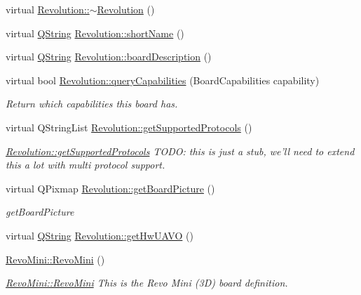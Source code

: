 \begin{DoxyCompactItemize}
virtual \hyperlink{group___boards___open_pilot_plugin_ga231a5a6f79ce02a7e05009982fb65d15}{\-Revolution\-::$\sim$\-Revolution} ()
\item 
virtual \hyperlink{group___u_a_v_objects_plugin_gab9d252f49c333c94a72f97ce3105a32d}{\-Q\-String} \hyperlink{group___boards___open_pilot_plugin_gad4cc3e213b15f56ace6281fe55d94f32}{\-Revolution\-::short\-Name} ()
\item 
virtual \hyperlink{group___u_a_v_objects_plugin_gab9d252f49c333c94a72f97ce3105a32d}{\-Q\-String} \hyperlink{group___boards___open_pilot_plugin_ga8f2a18257adeeb2cd190e4150cf5cc01}{\-Revolution\-::board\-Description} ()
\item 
virtual bool \hyperlink{group___boards___open_pilot_plugin_gaef49c9e5a2cbbcbce7b6e7ed3867adaf}{\-Revolution\-::query\-Capabilities} (\-Board\-Capabilities capability)
\begin{DoxyCompactList}\small\item\em \-Return which capabilities this board has. \end{DoxyCompactList}\item 
virtual \-Q\-String\-List \hyperlink{group___boards___open_pilot_plugin_gaec390e1462c61b4e0d3b433f35159192}{\-Revolution\-::get\-Supported\-Protocols} ()
\begin{DoxyCompactList}\small\item\em \hyperlink{group___boards___open_pilot_plugin_gaec390e1462c61b4e0d3b433f35159192}{\-Revolution\-::get\-Supported\-Protocols} \-T\-O\-D\-O\-: this is just a stub, we'll need to extend this a lot with multi protocol support. \end{DoxyCompactList}\item 
virtual \-Q\-Pixmap \hyperlink{group___boards___open_pilot_plugin_gae5372488eec83623b6aad34593708034}{\-Revolution\-::get\-Board\-Picture} ()
\begin{DoxyCompactList}\small\item\em get\-Board\-Picture \end{DoxyCompactList}\item 
virtual \hyperlink{group___u_a_v_objects_plugin_gab9d252f49c333c94a72f97ce3105a32d}{\-Q\-String} \hyperlink{group___boards___open_pilot_plugin_ga0a6612a8dd453bde6ec037442d18c7c7}{\-Revolution\-::get\-Hw\-U\-A\-V\-O} ()
\item 
\hyperlink{group___boards___open_pilot_plugin_ga95d3e848c16c6f33a7d1acc14b2773da}{\-Revo\-Mini\-::\-Revo\-Mini} ()
\begin{DoxyCompactList}\small\item\em \hyperlink{group___boards___open_pilot_plugin_ga95d3e848c16c6f33a7d1acc14b2773da}{\-Revo\-Mini\-::\-Revo\-Mini} \-This is the \-Revo \-Mini (3\-D) board definition. \end{DoxyCompactList}\item 

\end{DoxyCompactItemize}
